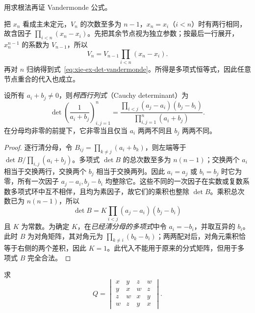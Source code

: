 \begin{example}
\label{ex:xie-ex-det-vandermonde-roots}
用求根法再证 Vandermonde 公式。
\end{example}

\begin{solve}
把 $x_n$ 看成主未定元，$V_n$ 的次数至多为 $n-1$，$x_n=x_i$（$i<n$）时有两行相同，故含因子 $\prod_{i<n}(x_n-x_i)$。先把其余节点视为独立参数；按最后一行展开，$x_n^{n-1}$ 的系数为 $V_{n-1}$，所以
\[
V_n=V_{n-1}\prod_{i<n}(x_n-x_i).
\]
再对 $n$ 归纳得到式~\eqref{eq:xie-ex-det-vandermonde}。所得是多项式恒等式，因此任意节点重合的代入也成立。
\end{solve}

\begin{theorem}
\label{thm:xie-ex-det-cauchy}
设所有 $a_i+b_j\ne0$，则\emph{柯西行列式}（Cauchy determinant）为
\begin{equation}
\label{eq:xie-ex-det-cauchy}
\det\left(\frac1{a_i+b_j}\right)_{i,j=1}^{n}
=\frac{\prod_{i<j}(a_j-a_i)(b_j-b_i)}{\prod_{i,j=1}^{n}(a_i+b_j)}.
\end{equation}
在分母均非零的前提下，它非零当且仅当 $a_i$ 两两不同且 $b_j$ 两两不同。
\end{theorem}

\begin{proof}
逐行清分母，令 $B_{ij}=\prod_{k\ne j}(a_i+b_k)$，则左端等于 $\det B/\prod_{i,j}(a_i+b_j)$。多项式 $\det B$ 的总次数至多为 $n(n-1)$；交换两个 $a_i$ 相当于交换两行，交换两个 $b_j$ 相当于交换两列。因此 $a_i=a_j$ 或 $b_i=b_j$ 时它为零，所有一次因子 $a_j-a_i,b_j-b_i$ 均整除它。这些不同的一次因子在实数或复数系数多项式环中互不相伴，且均为素因子，故它们的乘积也整除 $\det B$。乘积总次数已为 $n(n-1)$，所以
\[
\det B=K\prod_{i<j}(a_j-a_i)(b_j-b_i)
\]
且 $K$ 为常数。为确定 $K$，在\emph{已经清分母的多项式}中令 $a_i=-b_i$，并取互异的 $b_i$。此时 $B$ 为对角矩阵，其对角元为 $\prod_{k\ne i}(b_k-b_i)$；两两配对后，对角元乘积恰等于右侧的两个差积，因此 $K=1$。此代入不能用于原来的分式矩阵，但用于多项式 $B$ 完全合法。
\end{proof}

\begin{example}
\label{ex:xie-ex-det-four-factors}
求
\[
Q=\begin{vmatrix}
x&y&z&w\\y&x&w&z\\z&w&x&y\\w&z&y&x
\end{vmatrix}.
\]
\end{example}

